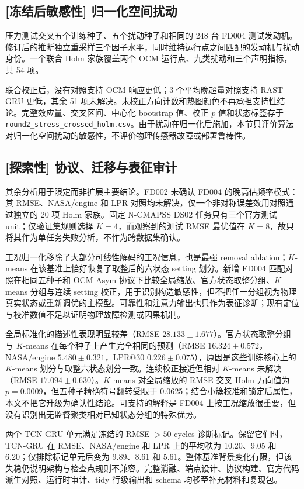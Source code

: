 \subsection{[冻结后敏感性] 归一化空间扰动}

压力测试交叉五个训练种子、五个扰动种子和相同的 248 台 FD004 测试发动机。修订后的推断独立重采样三个因子水平，同时维持运行点之间匹配的发动机与扰动身份。一个联合 Holm 家族覆盖两个 OCM 运行点、九类扰动和三个声明指标，共 54 项。



联合校正后，没有对照支持 OCM 响应更低；3 个平均晚超量对照支持 RAST-GRU 更低，其余 51 项未解决。未校正方向计数和热图颜色不再承担支持性结论。完整效应量、交叉区间、中心化 bootstrap 值、校正 $p$ 值和状态标签存于 \texttt{round2\_stress\_crossed\_holm.csv}。由于扰动在归一化后施加，本节只评价算法对归一化空间扰动的敏感性，不评价物理传感器故障或部署鲁棒性。

\subsection{[探索性] 协议、迁移与表征审计}

其余分析用于限定而非扩展主要结论。FD002 未确认 FD004 的晚高估频率模式：其 RMSE、NASA/engine 和 LPR 对照均未解决，仅一个非对称误差效用对照通过独立的 20 项 Holm 家族。固定 N-CMAPSS DS02 任务只有三个官方测试 unit；仅验证集规则选择 $K=4$，而观察到的测试 RMSE 最优值在 $K=8$，故只将其作为单任务失败分析，不作为跨数据集确认。

工况归一化移除了大部分可线性解码的工况信息，也是最强 removal ablation；$K$-means 在该基准上恰好恢复了取整后的六状态 setting 划分。新增 FD004 匹配对照在相同五种子和 OCM-Asym 协议下比较全局缩放、官方状态取整分组、$K$-means 分组与连续 setting 校正，用于识别构造敏感性，但不把任一分组视为物理真实状态或重新调优的主模型。可靠性和注意力输出也只作为表征诊断；现有定位与校准数值不足以证明物理故障检测或因果机制。



全局标准化的描述性表现明显较差（RMSE $28.133\pm1.677$）。官方状态取整分组与 $K$-means 在每个种子上产生完全相同的预测（RMSE $16.324\pm0.572$，NASA/engine $5.480\pm0.321$，LPR@30 $0.226\pm0.075$），原因是这些训练核心上的 $K$-means 划分与取整六状态划分一致。连续校正接近但相对 $K$-means 未解决（RMSE $17.094\pm0.630$）。$K$-means 对全局缩放的 RMSE 交叉-Holm 方向值为 $p=0.0009$，但五种子精确符号翻转受限于 0.0625；结合小簇校准和锁定后属性，本文不把它升级为确认性结论。可支持的解释是 FD004 上按工况缩放很重要，但没有识别出无监督聚类相对已知状态分组的特殊优势。

两个 TCN-GRU 单元满足冻结的 RMSE $>50$ cycles 诊断标记。保留它们时，TCN-GRU 在 RMSE、NASA/engine 和 LPR 上的平均秩为 10.20、9.05 和 6.20；仅排除标记单元后变为 9.89、8.61 和 5.61。整体基准背景变化有限，但该失稳仍说明架构与检查点规则不兼容。完整消融、端点设计、协议构建、官方代码派生对照、运行时审计、tidy 行级输出和 schema 均移至补充材料和复现包。
\FloatBarrier
